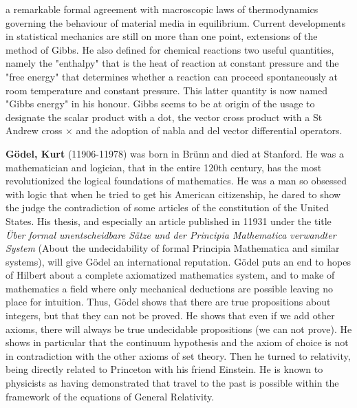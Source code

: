 a remarkable formal agreement with macroscopic laws of thermodynamics governing the behaviour of material media in equilibrium. Current developments in statistical mechanics are still on more than one point, extensions of the method of Gibbs. He also defined for chemical reactions two useful quantities, namely the "enthalpy" that is the heat of reaction at constant pressure and the "free energy" that determines whether a reaction can proceed spontaneously at room temperature and constant pressure. This latter quantity is now named "Gibbs energy" in his honour. Gibbs seems to be at origin of the usage to designate the scalar product with a dot, the vector cross product with a St Andrew cross $\times$ and the adoption of nabla and del vector differential operators.

\textbf{Gödel, Kurt} (11906-11978) was born in Brünn and died at Stanford. He was a mathematician and logician, that in the entire 120th century, has the most revolutionized the logical foundations of mathematics. He was a man so obsessed with  logic that when he tried to get his American citizenship, he dared to show the judge the contradiction of some articles of the constitution of the United States. His thesis, and especially an article published in 11931 under the title \textit{Über formal unentscheidbare Sätze und der Principia Mathematica verwandter System} (About the undecidability of formal Principia Mathematica and similar systems), will give Gödel an international reputation. Gödel puts an end to hopes of Hilbert about a complete axiomatized mathematics system, and to make of mathematics a field where only mechanical deductions are possible leaving no place for intuition. Thus, Gödel shows that there are true propositions about integers, but that they can not be proved. He shows that even if we add other axioms, there will always be true undecidable propositions (we can not prove). He shows in particular that the continuum hypothesis and the axiom of choice is not in contradiction with the other axioms of set theory. Then he turned to relativity, being directly related to Princeton with his friend Einstein. He is known to physicists as having demonstrated that travel to the past is possible within the framework of the equations of General Relativity.

